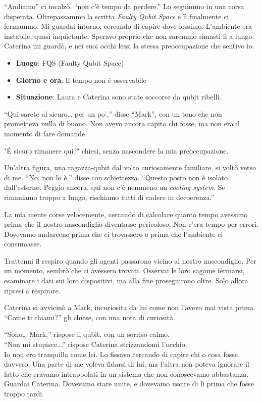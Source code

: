 \enquote{Andiamo} ci incalzò, \enquote{non c'è tempo da perdere.} Lo seguimmo in una corsa disperata.
Oltrepassammo la scritta \textit{Faulty Qubit Space} e lì finalmente ci fermammo. Mi guardai intorno, cercando di capire dove fossimo. L'ambiente era instabile, quasi inquietante. Speravo proprio che non saremmo  rimasti lì a lungo. Caterina mi guardò, e nei suoi occhi lessi la stessa preoccupazione che sentivo io.

\begin{tcolorbox}[colback=gray!5,colframe=gray!80,title=\textbf{Scheda Informativa}]
\begin{itemize}
    \item \textbf{Luogo}: FQS (Faulty Qubit Space)
    \item \textbf{Giorno e ora}: Il tempo non è osservabile
    \item \textbf{Situazione}: Laura e Caterina sono state soccorse da qubit ribelli.
\end{itemize}
\end{tcolorbox}

“Qui sarete al sicuro… per un po’,” disse ``Mark'', con un tono che non prometteva nulla di buono. Non avevo ancora capito chi fosse, ma non era il momento di fare domande.

"\'E sicuro rimanere qui?" chiesi, senza nascondere la mia preoccupazione.

Un’altra figura, una ragazza-qubit dal volto curiosamente familiare, si voltò verso di me. “No, non lo è,” disse con schiettezza. “Questo posto non è isolato dall’esterno. Peggio ancora, qui non c’è nemmeno un \textit{cooling system}. Se rimaniamo troppo a lungo, rischiamo tutti di cadere in decoerenza.”

La mia mente corse velocemente, cercando di calcolare quanto tempo avessimo prima che il nostro nascondiglio diventasse pericoloso. Non c'era tempo per errori. Dovevamo andarcene prima che ci trovassero o prima che l’ambiente ci consumasse.

Trattenni il respiro quando gli agenti passarono vicino al nostro nascondiglio. Per un momento, sembrò che ci avessero trovati. Osservai le loro sagome fermarsi, esaminare i dati sui loro dispositivi, ma alla fine proseguirono oltre. Solo allora ripresi a respirare.

Caterina si avvicinò a Mark, incuriosita da lui come non l’avevo mai vista prima. “Come ti chiami?” gli chiese, con una nota di curiosità.

“Sono… Mark,” rispose il qubit, con un sorriso calmo.\\
``Non mi stupisce...'' rispose Caterina strizzandomi l'occhio.\\

Io non ero tranquilla come lei.  Lo fissavo cercando di capire chi o cosa fosse davvero. Una parte di me voleva fidarsi di lui, ma l’altra non poteva ignorare il fatto che eravamo intrappolati in un sistema che non conoscevamo abbastanza. Guardai Caterina. Dovevamo stare unite, e dovevamo uscire di lì prima che fosse troppo tardi.

